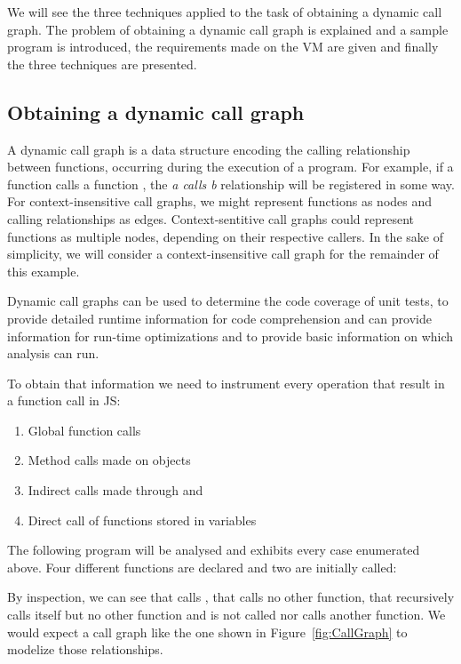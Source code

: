 We will see the three techniques applied to the task of obtaining a dynamic
call graph. The problem of obtaining a dynamic call graph is explained and a
sample program is introduced, the requirements made on the VM are given and
finally the three techniques are presented.

\subsection{Obtaining a dynamic call graph}

A dynamic call graph is a data structure encoding the calling relationship
between functions, occurring during the execution of a program. For example, if
a function  calls a function , the \textit{a calls b} relationship
will be registered in some way. For context-insensitive call graphs, we might
represent functions as nodes and calling relationships as edges.
Context-sentitive call graphs could represent functions as multiple nodes,
depending on their respective callers. In the sake of simplicity, we will
consider a context-insensitive call graph for the remainder of this example. 

Dynamic call graphs can be used to determine the code coverage of unit tests,
to provide detailed runtime information for code comprehension and can provide
information for run-time optimizations and to provide basic information on which
analysis can run.

To obtain that information we need to instrument every operation that result in
a function call in JS:
\begin{enumerate}
    \item Global function calls
    \item Method calls made on objects
    \item Indirect calls made through  and  
    \item Direct call of functions stored in variables
\end{enumerate}

The following program will be analysed and exhibits every case enumerated
above. Four different functions are declared and two are initially called:


By inspection, we can see that  calls , that  calls no other
function, that  recursively calls itself but no other function and 
is not called nor calls another function. We would expect a call graph like the
one shown in Figure~\ref{fig:CallGraph} to modelize those relationships.

